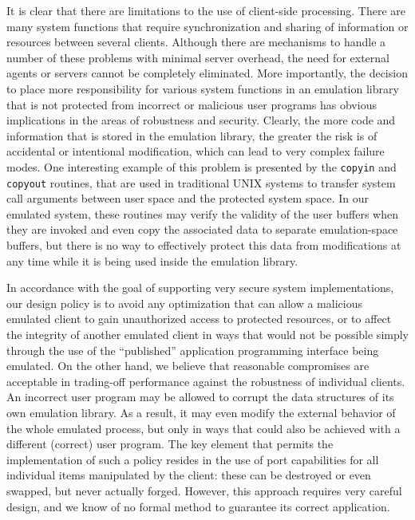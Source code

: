 It is clear that there are limitations to the use of client-side
processing. There are many system functions that require
synchronization and sharing of information or resources between
several clients.  Although there are mechanisms to handle a number of
these problems with minimal server overhead, the need for external
agents or servers cannot be completely eliminated. More importantly,
the decision to place more responsibility for various system functions
in an emulation library that is not protected from incorrect or
malicious user programs has obvious implications in the areas of
robustness and security. Clearly, the more code and information that
is stored in the emulation library, the greater the risk is of
accidental or intentional modification, which can lead to very complex
failure modes. One interesting example of this problem is presented by
the {\tt copyin} and {\tt copyout} routines, that are used in
traditional UNIX systems to transfer system call arguments between
user space and the protected system space. In our emulated system,
these routines may verify the validity of the user buffers when they
are invoked and even copy the associated data to separate
emulation-space buffers, but there is no way to effectively protect
this data from modifications at any time while it is being used inside
the emulation library.

In accordance with the goal of supporting very secure system
implementations, our design policy is to avoid any optimization that
can allow a malicious emulated client to gain unauthorized access to
protected resources, or to affect the integrity of another emulated
client in ways that would not be possible simply through the use of
the ``published'' application programming interface being emulated.
On the other hand, we believe that reasonable compromises are
acceptable in trading-off performance against the robustness of
individual clients. An incorrect user program may be allowed to
corrupt the data structures of its own emulation library. As a result,
it may even modify the external behavior of the whole emulated
process, but only in ways that could also be achieved with a different
(correct) user program.  The key element that permits the
implementation of such a policy resides in the use of port
capabilities for all individual items manipulated by the client: these
can be destroyed or even swapped, but never actually forged.  However,
this approach requires very careful design, and we know of no formal
method to guarantee its correct application. 

